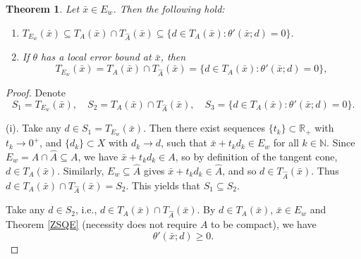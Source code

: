\documentclass[11pt]{article}
\newtheorem{theorem}{Theorem}[section]
\begin{document}
\begin{theorem} \label{ZAQW}  Let $\bar{x}\in E_w$. 	Then the following hold:
	\begin{enumerate}
		\item[(i)]  	$
		T_{E_w}(\bar{x}) \subseteq T_A(\bar{x})\cap T_{\widehat{A}}(\bar{x}) \subseteq \{d\in T_A(\bar{x}):\theta'(\bar{x};d)=0\}.
	$
		
				\item[(ii)]  If $\theta$ has a local error bound at   $\bar x$, then 
					\[
				T_{E_w}(\bar{x})=T_A(\bar{x})\cap T_{\widehat{A}}(\bar{x})=\{d\in T_A(\bar{x}):\theta'(\bar{x};d)=0\},
				\]
				
			\end{enumerate}	 
\end{theorem}

 \begin{proof} 
Denote
\[
S_1=T_{E_w}(\bar{x}),\quad S_2=T_A(\bar{x})\cap T_{\widehat{A}}(\bar{x}),\quad S_3=\{d\in T_A(\bar{x}):\theta'(\bar{x};d)=0\}.
\]

 

(i).  Take any $d\in S_1=T_{E_w}(\bar{x})$. Then there exist sequences $\{t_k\}\subset\mathbb{R}_+$ with $t_k\to0^+$, and $\{d_k\}\subset X$ with $d_k\to d$, such that      $\bar{x}+t_k d_k\in E_w$       for all $k\in \mathbb{N}$.
 Since $E_w=A\cap\widehat{A}\subseteq A$, we have $\bar{x}+t_k d_k\in A$, so by definition of the tangent cone, $d\in T_A(\bar{x})$.
Similarly, $E_w\subseteq\widehat{A}$ gives $\bar{x}+t_k d_k\in\widehat{A}$, and so $d\in T_{\widehat{A}}(\bar{x})$.
Thus $d\in T_A(\bar{x})\cap T_{\widehat{A}}(\bar{x})=S_2$.  This yields     that $S_1\subseteq S_2$.

 

Take any $d\in S_2$, i.e., $d\in T_A(\bar{x})\cap T_{\widehat{A}}(\bar{x})$. 
By $d\in T_A(\bar{x})$, $\bar{x}\in E_w$ and Theorem \ref{ZSQE} (necessity does not require $A$ to be compact), we have
\begin{equation}\label{Euiv1}
\theta'(\bar{x};d)\ge 0.  
\end{equation}



\end{proof}
\end{document}
